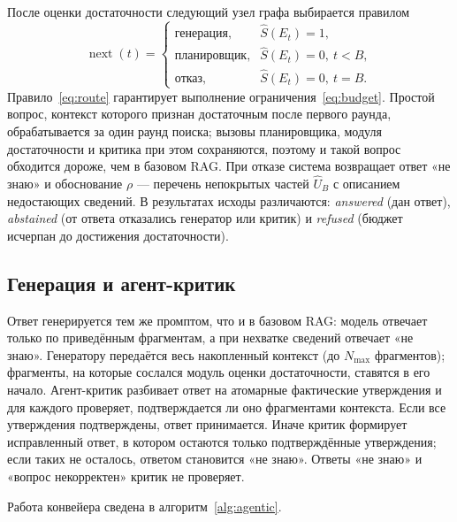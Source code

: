 \documentclass{misisarticle}
\begin{document}
После оценки достаточности следующий узел графа выбирается правилом
\begin{equation}
  \operatorname{next}(t) =
  \begin{cases}
    \text{генерация}, & \hat{S}(E_t) = 1,\\
    \text{планировщик}, & \hat{S}(E_t) = 0,\ t < B,\\
    \text{отказ}, & \hat{S}(E_t) = 0,\ t = B.
  \end{cases}
  \label{eq:route}
\end{equation}
Правило~\eqref{eq:route} гарантирует выполнение ограничения~\eqref{eq:budget}.
Простой вопрос, контекст которого признан достаточным после первого раунда, обрабатывается за один раунд поиска; вызовы планировщика, модуля достаточности и критика при этом сохраняются, поэтому и такой вопрос обходится дороже, чем в базовом RAG.
При отказе система возвращает ответ «не знаю» и обоснование $\rho$ --- перечень непокрытых частей $\hat{U}_B$ с описанием недостающих сведений.
В результатах исходы различаются: \textit{answered} (дан ответ), \textit{abstained} (от ответа отказались генератор или критик) и \textit{refused} (бюджет исчерпан до достижения достаточности).

\subsection{Генерация и агент-критик}

Ответ генерируется тем же промптом, что и в базовом RAG: модель отвечает только по приведённым фрагментам, а при нехватке сведений отвечает «не знаю».
Генератору передаётся весь накопленный контекст (до $N_{\max}$ фрагментов); фрагменты, на которые сослался модуль оценки достаточности, ставятся в его начало.
Агент-критик разбивает ответ на атомарные фактические утверждения и для каждого проверяет, подтверждается ли оно фрагментами контекста.
Если все утверждения подтверждены, ответ принимается.
Иначе критик формирует исправленный ответ, в котором остаются только подтверждённые утверждения; если таких не осталось, ответом становится «не знаю».
Ответы «не знаю» и «вопрос некорректен» критик не проверяет.

Работа конвейера сведена в алгоритм~\ref{alg:agentic}.
\end{document}
